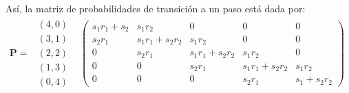 \begin{enumerate}
\begin{itemize}
            Así, la matriz de probabilidades de transición a un paso está dada por:
            \begin{displaymath}
            \mathbf{P} = \begin{array}{ccccc}
                \begin{array}{c}  (4,0)\\(3,1)\\(2,2)\\(1,3)\\(0,4) \end{array} &  \left( \begin{array}{ccccc}
                s_1r_1+s_2 &s_1r_2&0&0&0\\
                s_2r_1&s_1r_1+s_2r_2&s_1r_2&0&0\\
                0&s_2r_1&s_1r_1+s_2r_2&s_1r_2&0\\
                0&0&s_2r_1&s_1r_1+s_2r_2&s_1r_2\\
                0&0&0&s_2r_1&s_1+s_2r_2
                \end{array} \right)  
            \end{array}
            \end{displaymath}
    
    \end{itemize}

\end{enumerate}
